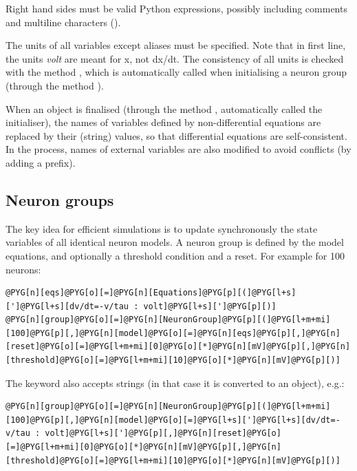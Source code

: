 \documentclass[letterpaper,10pt,english]{manual}
\begin{document}
Right hand sides must be valid Python expressions, possibly including comments and
multiline characters (\code{\textbackslash{}}).

The units of all variables except aliases must be specified. Note that in first line,
the units \emph{volt} are meant for x, not dx/dt. The consistency of all units is checked
with the method , which is automatically called
when initialising a neuron group (through the method ).

When an \hyperlink{brian.Equations}{} object is finalised (through the method ,
automatically called the \hyperlink{brian.NeuronGroup}{} initialiser), the names of variables defined by
non-differential equations are replaced by their (string) values, so that differential equations
are self-consistent. In the process, names of external variables are also modified to avoid
conflicts (by adding a prefix).


\subsection{Neuron groups}

The key idea for efficient simulations is to update synchronously the state variables
of all identical neuron models. A neuron group is defined by the model equations, and
optionally a threshold condition and a reset. For example for 100 neurons:

\begin{Verbatim}[commandchars=@\[\]]
@PYG[n][eqs]@PYG[o][=]@PYG[n][Equations]@PYG[p][(]@PYG[l+s][']@PYG[l+s][dv/dt=-v/tau : volt]@PYG[l+s][']@PYG[p][)]
@PYG[n][group]@PYG[o][=]@PYG[n][NeuronGroup]@PYG[p][(]@PYG[l+m+mi][100]@PYG[p][,]@PYG[n][model]@PYG[o][=]@PYG[n][eqs]@PYG[p][,]@PYG[n][reset]@PYG[o][=]@PYG[l+m+mi][0]@PYG[o][*]@PYG[n][mV]@PYG[p][,]@PYG[n][threshold]@PYG[o][=]@PYG[l+m+mi][10]@PYG[o][*]@PYG[n][mV]@PYG[p][)]
\end{Verbatim}

The  keyword also accepts strings (in that case it is converted to an \hyperlink{brian.Equations}{}
object), e.g.:

\begin{Verbatim}[commandchars=@\[\]]
@PYG[n][group]@PYG[o][=]@PYG[n][NeuronGroup]@PYG[p][(]@PYG[l+m+mi][100]@PYG[p][,]@PYG[n][model]@PYG[o][=]@PYG[l+s][']@PYG[l+s][dv/dt=-v/tau : volt]@PYG[l+s][']@PYG[p][,]@PYG[n][reset]@PYG[o][=]@PYG[l+m+mi][0]@PYG[o][*]@PYG[n][mV]@PYG[p][,]@PYG[n][threshold]@PYG[o][=]@PYG[l+m+mi][10]@PYG[o][*]@PYG[n][mV]@PYG[p][)]
\end{Verbatim}
\end{document}
